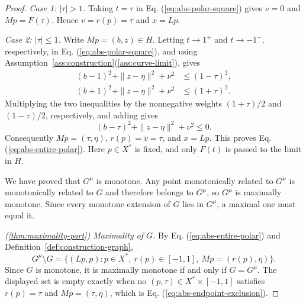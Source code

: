 \documentclass[11pt]{article}
\theoremstyle{definition}
\theoremstyle{remark}
\begin{document}
\begin{proof}
\emph{Case 1: $|\tau|>1$.} Taking $t=\tau$ in Eq. (\ref{eq:abs-polar-square}) gives $\nu=0$ and $Mp=F(\tau)$. Hence $v=r(p)=\tau$ and $x=Lp$.

\emph{Case 2: $|\tau|\le1$.} Write $Mp=(b,z)\in H$. Letting $t\to1^+$ and $t\to-1^-$, respectively, in Eq. (\ref{eq:abs-polar-square}), and using Assumption~\ref{ass:construction}\textup{(\ref{ass:curve-limit})}, gives
\[
\begin{aligned}
(b-1)^2+\|z-\eta\|^2+\nu^2&\le(1-\tau)^2,\\
(b+1)^2+\|z-\eta\|^2+\nu^2&\le(1+\tau)^2.
\end{aligned}
\]
Multiplying the two inequalities by the nonnegative weights $(1+\tau)/2$ and $(1-\tau)/2$, respectively, and adding gives
\[
(b-\tau)^2+\|z-\eta\|^2+\nu^2\le0.
\]
Consequently $Mp=(\tau,\eta)$, $r(p)=v=\tau$, and $x=Lp$. This proves Eq. (\ref{eq:abs-entire-polar}). Here $p\in X^*$ is fixed, and only $F(t)$ is passed to the limit in $H$.

We have proved that $G^\mu$ is monotone. Any point monotonically related to $G^\mu$ is monotonically related to $G$ and therefore belongs to $G^\mu$, so $G^\mu$ is maximally monotone. Since every monotone extension of $G$ lies in $G^\mu$, a maximal one must equal it.

\noindent\textit{\textup{(\ref{thm:maximality-part})} Maximality of $G$.}
By Eq. (\ref{eq:abs-entire-polar}) and Definition~\ref{def:construction-graph},
\[
G^\mu\setminus G
=\{(Lp,p):p\in X^*,\ r(p)\in[-1,1],\ Mp=(r(p),\eta)\}.
\]
Since $G$ is monotone, it is maximally monotone if and only if $G=G^\mu$. The displayed set is empty exactly when no $(p,\tau)\in X^*\times[-1,1]$ satisfies $r(p)=\tau$ and $Mp=(\tau,\eta)$, which is Eq. (\ref{eq:abs-endpoint-exclusion}).


\end{proof}
\end{document}
